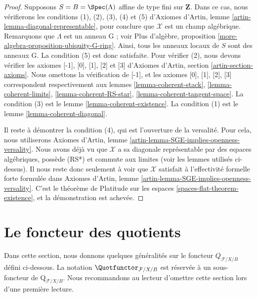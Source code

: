 \begin{proof}
\medskip\noindent
Supposons $S = B = \Spec(\Lambda)$ affine de type fini sur $\mathbf{Z}$. Dans
ce cas, nous vérifierons les conditions (1), (2), (3), (4) et (5) d'Axiomes
d'Artin, lemme \ref{artin-lemma-diagonal-representable}, pour conclure que
$\mathcal{X}$ est un champ algébrique. Remarquons que $\Lambda$ est un anneau
G ; voir Plus d'algèbre, proposition
\ref{more-algebra-proposition-ubiquity-G-ring}. Ainsi, tous les anneaux locaux
de $S$ sont des anneaux G. La condition (5) est donc satisfaite. Pour vérifier
(2), nous devons vérifier les axiomes [-1], [0], [1], [2] et [3] d'Axiomes
d'Artin, section \ref{artin-section-axioms}. Nous omettons la vérification de
[-1], et les axiomes [0], [1], [2], [3] correspondent respectivement aux
lemmes \ref{lemma-coherent-stack}, \ref{lemma-coherent-limits},
\ref{lemma-coherent-RS-star}, \ref{lemma-coherent-tangent-space}. La condition
(3) est le lemme \ref{lemma-coherent-existence}. La condition (1) est le lemme
\ref{lemma-coherent-diagonal}.

\medskip\noindent
Il reste à démontrer la condition (4), qui est l'ouverture de la versalité.
Pour cela, nous utiliserons Axiomes d'Artin, lemme
\ref{artin-lemma-SGE-implies-openness-versality}. Nous avons déjà vu que
$\mathcal{X}$ a sa diagonale représentable par des espaces algébriques,
possède (RS*) et commute aux limites (voir les lemmes utilisés ci-dessus). Il
nous reste donc seulement à voir que $\mathcal{X}$ satisfait à l'effectivité
formelle forte formulée dans Axiomes d'Artin, lemme
\ref{artin-lemma-SGE-implies-openness-versality}. C'est le théorème de
Platitude sur les espaces \ref{spaces-flat-theorem-existence}, et la
démonstration est achevée.
\end{proof}

\section{Le foncteur des quotients}
\label{section-functor-quotients}

\noindent
Dans cette section, nous donnons quelques généralités sur le foncteur
$Q_{\mathcal{F}/X/B}$ défini ci-dessous. La notation
$\Quotfunctor_{\mathcal{F}/X/B}$ est réservée à un sous-foncteur de
$\text{Q}_{\mathcal{F}/X/B}$. Nous recommandons au lecteur d'omettre cette
section lors d'une première lecture.

